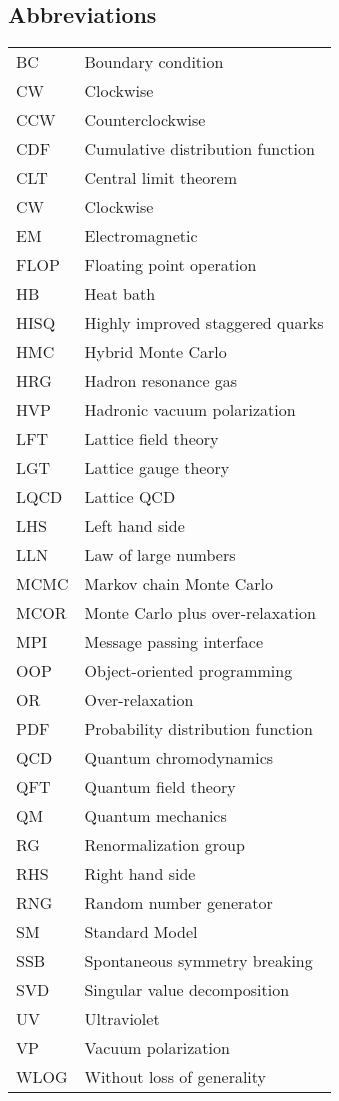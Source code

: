 \documentclass[12pt]{book}
\theoremstyle{definition}
\newenvironment{frontstuff}
  {\centering\chapter*{}}
  {\clearpage}
\begin{document}
\begin{frontstuff}
\section*{Abbreviations}
\begin{tabular}{ll}
BC      &       Boundary condition \\
CW      &       Clockwise \\
CCW     &       Counterclockwise\\
CDF     &       Cumulative distribution function \\
CLT     &       Central limit theorem\\
CW      &       Clockwise\\
EM      &       Electromagnetic\\
FLOP    &       Floating point operation\\
HB      &       Heat bath\\
HISQ    &       Highly improved staggered quarks\\
HMC     &       Hybrid Monte Carlo\\
HRG     &       Hadron resonance gas\\
HVP     &       Hadronic vacuum polarization\\
LFT     &       Lattice field theory\\
LGT     &       Lattice gauge theory\\
LQCD    &       Lattice QCD\\
LHS     &       Left hand side\\
LLN     &       Law of large numbers\\
MCMC    &       Markov chain Monte Carlo\\
MCOR    &       Monte Carlo plus over-relaxation \\
MPI     &       Message passing interface \\
OOP     &       Object-oriented programming \\
OR      &       Over-relaxation \\
PDF     &       Probability distribution function \\
QCD     &       Quantum chromodynamics \\
QFT     &       Quantum field theory \\
QM      &       Quantum mechanics \\
RG      &       Renormalization group \\
RHS     &       Right hand side \\
RNG     &       Random number generator \\
SM      &       Standard Model \\
SSB     &       Spontaneous symmetry breaking\\
SVD     &       Singular value decomposition\\
UV      &       Ultraviolet \\
VP      &       Vacuum polarization \\
WLOG    &       Without loss of generality
\end{tabular}
\clearpage



\end{frontstuff}
\end{document}
